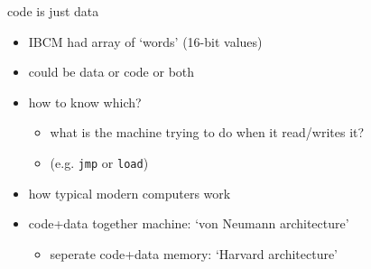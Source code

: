 \begin{frame}{code is just data}
\begin{itemize}
\item IBCM had array of `words' (16-bit values)
\item could be data or code or both
\item how to know which?
    \begin{itemize}
    \item what is the machine trying to do when it read/writes it?
    \item (e.g. \texttt{jmp} or \texttt{load})
    \end{itemize}
\item how typical modern computers work
\item code+data together machine: `von Neumann architecture'
    \begin{itemize}
    \item seperate code+data memory: `Harvard architecture'
    \end{itemize}
\end{itemize}
\end{frame}
